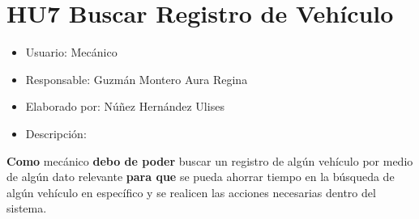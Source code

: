 \section{HU7 Buscar Registro de Vehículo}
\begin{itemize}
	\item Usuario: Mecánico
	\item Responsable: Guzmán Montero Aura Regina
	\item Elaborado por: Núñez Hernández Ulises
	\item Descripción:\\
\end{itemize}

\textbf{Como} mecánico \textbf{debo de poder} buscar un registro de algún vehículo por medio de algún dato relevante \textbf{para que} se pueda ahorrar tiempo en la búsqueda de algún vehículo en específico y se realicen las acciones necesarias dentro del sistema. 